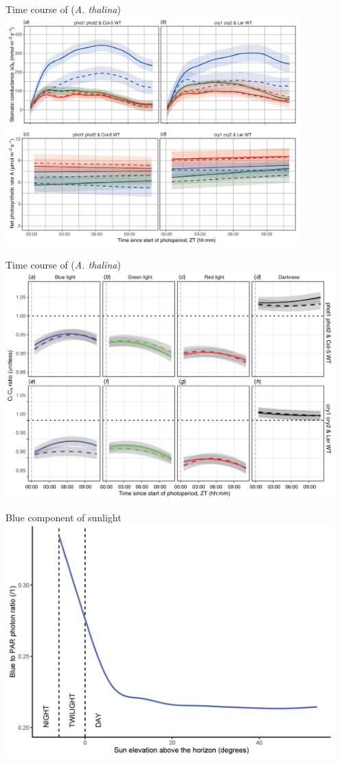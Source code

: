 \documentclass[10pt]{beamer}\usepackage[]{graphicx}\usepackage[]{color}
\begin{document}
\begin{frame}{Time course of \gs (\emph{A. thalina})}
 \centering
    \includegraphics[width=0.85\textwidth]{figures/Wang-A-gs-time-course-light}
\end{frame}

\begin{frame}{Time course of \gs (\emph{A. thalina})}
 \centering
    \includegraphics[width=0.95\textwidth]{figures/Wang-CiCa-time-course-light-dark}
\end{frame}

\begin{frame}{Blue component of sunlight}
 \centering
    \includegraphics[width=0.95\textwidth]{figures/blue-hour-plot}
\end{frame}
\end{document}
